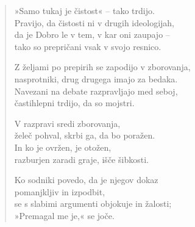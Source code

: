 \begin{verse}


»Samo tukaj je čistost« -- tako trdijo.\\
Pravijo, da čistosti ni v drugih ideologijah,\\
da je Dobro le v tem, v kar oni zaupajo --\\
tako so prepričani vsak v svojo resnico.

Z željami po prepirih se zapodijo v zborovanja,\\
nasprotniki, drug drugega imajo za bedaka.\\
Navezani na debate razpravljajo med seboj,\\
častihlepni trdijo, da so mojstri.

V razpravi sredi zborovanja,\\
želeč pohval, skrbi ga, da bo poražen.\\
In ko je ovržen, je otožen,\\
razburjen zaradi graje, išče šibkosti.

Ko sodniki povedo, da je njegov dokaz\\
pomanjkljiv in izpodbit,\\
se s slabimi argumenti objokuje in žalosti;\\
»Premagal me je,« se joče.

\end{verse}


